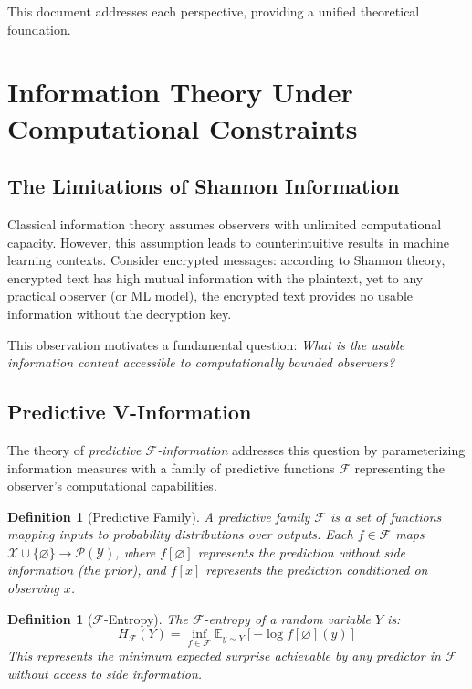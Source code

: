 \documentclass[11pt]{article}
\newtheorem{definition}[theorem]{Definition}
\newcommand{\E}{\mathbb{E}}
\newcommand{\X}{\mathcal{X}}
\newcommand{\Y}{\mathcal{Y}}
\newcommand{\F}{\mathcal{F}}
\begin{document}
This document addresses each perspective, providing a unified theoretical foundation.

\section{Information Theory Under Computational Constraints}

\subsection{The Limitations of Shannon Information}

Classical information theory assumes observers with unlimited computational capacity. However, this assumption leads to counterintuitive results in machine learning contexts. Consider encrypted messages: according to Shannon theory, encrypted text has high mutual information with the plaintext, yet to any practical observer (or ML model), the encrypted text provides no usable information without the decryption key.

This observation motivates a fundamental question: \emph{What is the usable information content accessible to computationally bounded observers?}

\subsection{Predictive V-Information}

The theory of \emph{predictive $\F$-information} addresses this question by parameterizing information measures with a family of predictive functions $\F$ representing the observer's computational capabilities.

\begin{definition}[Predictive Family]
A predictive family $\F$ is a set of functions mapping inputs to probability distributions over outputs. Each $f \in \F$ maps $\X \cup \{\varnothing\} \to \mathcal{P}(\Y)$, where $f[\varnothing]$ represents the prediction without side information (the prior), and $f[x]$ represents the prediction conditioned on observing $x$.
\end{definition}

\begin{definition}[$\F$-Entropy]
The $\F$-entropy of a random variable $Y$ is:
\begin{equation}
H_\F(Y) = \inf_{f \in \F} \E_{y \sim Y}\left[-\log f[\varnothing](y)\right]
\end{equation}
This represents the minimum expected surprise achievable by any predictor in $\F$ without access to side information.
\end{definition}
\end{document}
